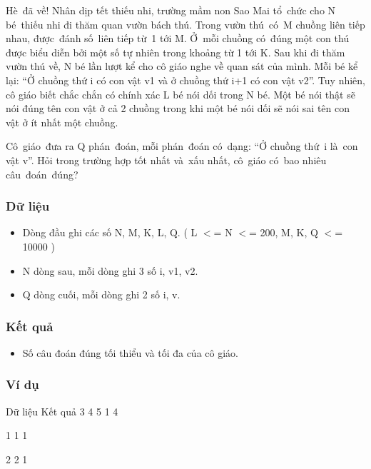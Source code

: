 



      Hè đã về! Nhân dịp  tết thiếu nhi, trường mầm non Sao Mai tổ chức cho  N bé thiếu nhi đi thăm quan vườn bách thú. Trong vườn  thú có M chuồng liên tiếp nhau, được đánh  số liên tiếp từ 1 tới M. Ở mỗi chuồng  có đúng một con thú được biểu diễn bởi một số  tự nhiên trong khoảng từ 1 tới K. Sau khi đi thăm vườn  thú về, N bé lần lượt kể cho cô giáo nghe về quan sát  của mình. Mỗi bé kể lại: “Ở chuồng thứ i có con vật  v1 và ở chuồng thứ i+1 có con vật v2”. Tuy nhiên, cô giáo  biết chắc chắn có chính xác L bé nói dối trong N bé. Một  bé nói thật sẽ nói đúng tên con vật ở cả 2 chuồng  trong khi một bé nói dối sẽ nói sai tên con vật ở ít  nhất một chuồng.     

      Cô giáo đưa ra  Q phán đoán, mỗi phán đoán có dạng: “Ở  chuồng thứ i là con vật v”. Hỏi trong trường  hợp tốt nhất và xấu nhất, cô giáo có bao  nhiêu câu đoán đúng?     

\subsubsection{     Dữ liệu    }
\begin{itemize}
	\item        Dòng đầu ghi    các số N, M, K, L, Q. ( L $<$= N $<$= 200, M, K, Q $<$= 10000    )      
	\item        N dòng sau, mỗi    dòng ghi 3 số i, v1, v2.      
	\item        Q dòng cuối,    mỗi dòng ghi 2 số i, v.      
\end{itemize}

\subsubsection{     Kết quả    }
\begin{itemize}
	\item        Số câu đoán    đúng tối thiểu và tối đa của cô giáo.      
\end{itemize}

\subsubsection{     Ví dụ    }          Dữ liệu                   Kết quả                   3 4 5 1 4         

           1 1 1          

           2 2 1          

